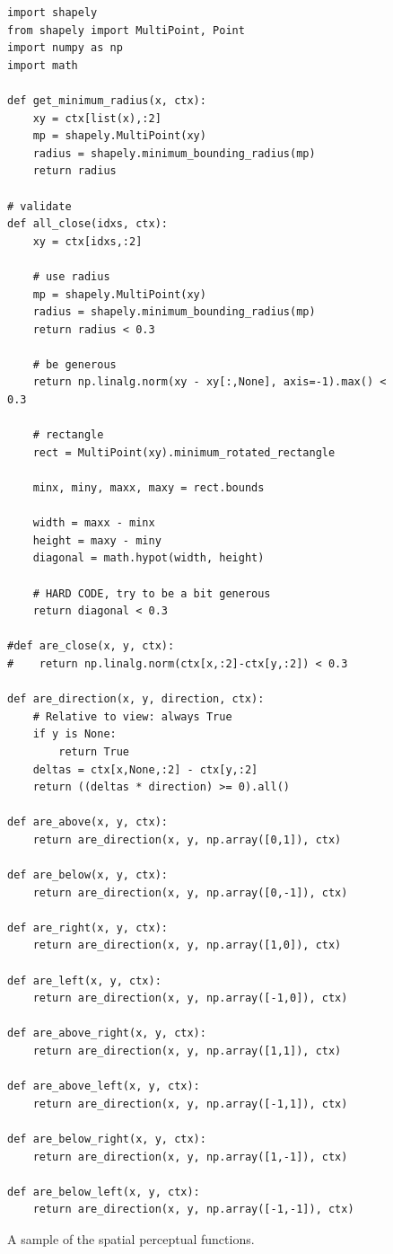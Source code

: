\documentclass[11pt]{article}
\begin{document}
\begin{figure}
\begin{lstlisting}
import shapely
from shapely import MultiPoint, Point
import numpy as np
import math

def get_minimum_radius(x, ctx):
    xy = ctx[list(x),:2]
    mp = shapely.MultiPoint(xy)
    radius = shapely.minimum_bounding_radius(mp)
    return radius

# validate
def all_close(idxs, ctx):
    xy = ctx[idxs,:2]

    # use radius
    mp = shapely.MultiPoint(xy)
    radius = shapely.minimum_bounding_radius(mp)
    return radius < 0.3

    # be generous
    return np.linalg.norm(xy - xy[:,None], axis=-1).max() < 0.3

    # rectangle
    rect = MultiPoint(xy).minimum_rotated_rectangle

    minx, miny, maxx, maxy = rect.bounds

    width = maxx - minx
    height = maxy - miny
    diagonal = math.hypot(width, height)

    # HARD CODE, try to be a bit generous
    return diagonal < 0.3

#def are_close(x, y, ctx):
#    return np.linalg.norm(ctx[x,:2]-ctx[y,:2]) < 0.3

def are_direction(x, y, direction, ctx):
    # Relative to view: always True
    if y is None:
        return True
    deltas = ctx[x,None,:2] - ctx[y,:2]
    return ((deltas * direction) >= 0).all()

def are_above(x, y, ctx):
    return are_direction(x, y, np.array([0,1]), ctx)

def are_below(x, y, ctx):
    return are_direction(x, y, np.array([0,-1]), ctx)

def are_right(x, y, ctx):
    return are_direction(x, y, np.array([1,0]), ctx)

def are_left(x, y, ctx):
    return are_direction(x, y, np.array([-1,0]), ctx)

def are_above_right(x, y, ctx):
    return are_direction(x, y, np.array([1,1]), ctx)

def are_above_left(x, y, ctx):
    return are_direction(x, y, np.array([-1,1]), ctx)

def are_below_right(x, y, ctx):
    return are_direction(x, y, np.array([1,-1]), ctx)

def are_below_left(x, y, ctx):
    return are_direction(x, y, np.array([-1,-1]), ctx)
\end{lstlisting}
\caption{A sample of the spatial perceptual functions.}
\label{fig:spatial}
\end{figure}
\end{document}
